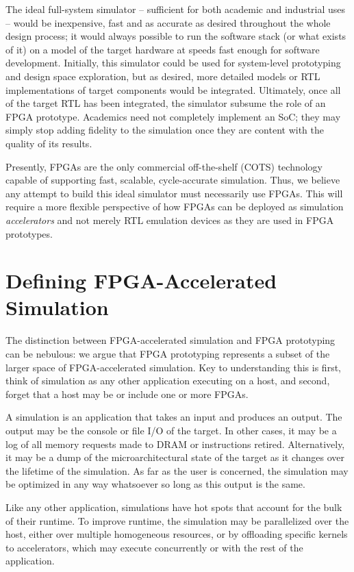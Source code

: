 The ideal full-system simulator -- sufficient for both academic and industrial
uses -- would be inexpensive, fast and as accurate as desired throughout the
whole design process; it would always possible to run the software stack (or
what exists of it) on a model of the target hardware at speeds fast enough for
software development. Initially, this simulator could be used for system-level
prototyping and design space exploration, but as desired, more detailed models
or RTL implementations of target components would be integrated. Ultimately,
once all of the target RTL has been integrated, the simulator subsume the role of an
FPGA prototype. Academics need not completely implement an SoC; they may simply
stop adding fidelity to the simulation once they are content with the quality
of its results.

Presently, FPGAs are the only commercial off-the-shelf (COTS) technology
capable of supporting fast, scalable, cycle-accurate simulation. Thus, we
believe any attempt to build this ideal simulator must necessarily use FPGAs.
This will require a more flexible perspective of how FPGAs can be deployed as
simulation \emph{accelerators} and not merely RTL emulation devices as they are
used in FPGA prototypes.

\section{Defining FPGA-Accelerated Simulation}

The distinction between FPGA-accelerated simulation and FPGA prototyping can be
nebulous: we argue that FPGA prototyping represents a subset of the larger
space of FPGA-accelerated simulation. Key to understanding this is first, think of
simulation as any other application executing on a host, and second, forget
that a host may be or include one or more FPGAs.

A simulation is an application that takes an input and produces an output.  The
output may be the console or file I/O of the target. In other cases, it
may be a log of all memory requests made to DRAM or instructions retired.
Alternatively, it may be a dump of the microarchitectural state of the target as it changes over the
lifetime of the simulation.  As far as the user is concerned, the simulation
may be optimized in any way whatsoever so long as this output is the same.

Like any other application, simulations have hot spots that account for the bulk
of their runtime. To improve runtime, the simulation may be parallelized over
the host, either over multiple homogeneous resources, or by offloading specific
kernels to accelerators, which may execute concurrently or with the rest
of the application.

